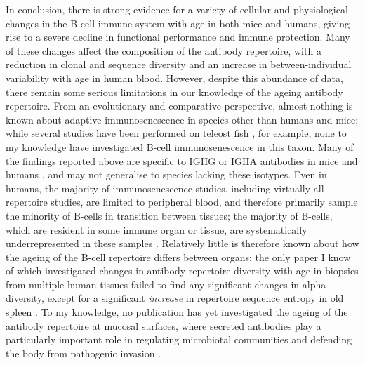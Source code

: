 In conclusion, there is strong evidence for a variety of cellular and physiological changes in the B-cell immune system with age in both mice and humans, giving rise to a severe decline in functional performance and immune protection. Many of these changes affect the composition of the antibody repertoire, with a reduction in clonal and sequence diversity and an increase in between-individual variability with age in human blood. However, despite this abundance of data, there remain some serious limitations in our knowledge of the ageing antibody repertoire.  From an evolutionary and comparative perspective, almost nothing is known about adaptive immunosenescence in species other than humans and mice; while several \igseq studies have been performed on teleost fish \parencite{weinstein2009igseq,jiang2011determinism,krasnov2017igseq,lund2019salmon,fu2018fugu}, for example, none to my knowledge have investigated B-cell immunosenescence in this taxon. Many of the findings reported above are specific to IGHG or IGHA antibodies in mice and humans \parencite{kogut2012bcells}, and may not generalise to species lacking these isotypes. Even in humans, the majority of immunosenescence studies, including virtually all repertoire studies, are limited to peripheral blood, and therefore primarily sample the minority of B-cells in transition between tissues; the majority of B-cells, which are resident in some immune organ or tissue, are systematically underrepresented in these samples \parencite{siegrist2009extremes,tabibiankeissar2016ageing}. Relatively little is therefore known about how the ageing of the B-cell repertoire differs between organs; the only paper I know of which investigated changes in antibody-repertoire diversity with age in biopsies from multiple human tissues failed to find any significant changes in alpha diversity, except for a significant \textit{increase} in repertoire sequence entropy in old spleen \parencite{tabibiankeissar2016ageing}. To my knowledge, no publication has yet investigated the ageing of the antibody repertoire at mucosal surfaces, where secreted antibodies play a particularly important role in regulating microbiotal communities and defending the body from pathogenic invasion \parencite{belkaid2014microbiota}.

